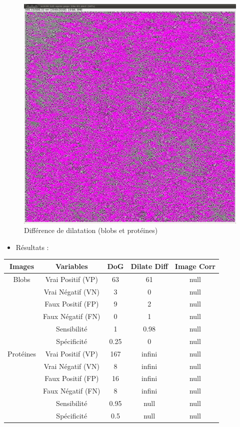 \begin{figure}[!ht]
\begin{center}
\begin{minipage}{.450\linewidth}
  \includegraphics[width=1\textwidth]{protDilate.png}   
 \end{minipage} \hfill
\caption{Différence de dilatation (blobs et protéines)}
\end{center}
\end{figure}
\pagebreak

\begin{itemize}
\item Résultats :
\end{itemize}

\begin{center}
\begin{tabular}{|c|c|c|c|c|}
\hline
\textbf{Images} & \textbf{Variables} & \textbf{DoG} & \textbf{Dilate Diff} & \textbf{Image Corr} \\
\hline
Blobs & Vrai Positif (VP) & 63 & 61 & null \\
	& Vrai Négatif (VN) & 3 & 0 & null \\
	& Faux Positif (FP) & 9 & 2 & null \\
	& Faux Négatif (FN) & 0 & 1 & null \\
	& Sensibilité & 1 & 0.98 & null \\
	& Spécificité & 0.25 & 0 & null \\
\hline
Protéines & Vrai Positif (VP) & 167 & infini & null \\
	& Vrai Négatif (VN) & 8 & infini & null \\
	& Faux Positif (FP) & 16 & infini & null \\
	& Faux Négatif (FN) & 8 & infini & null \\
	& Sensibilité & 0.95 & null & null \\
	& Spécificité & 0.5 & null & null \\
	\hline
\end{tabular}
\end{center}


